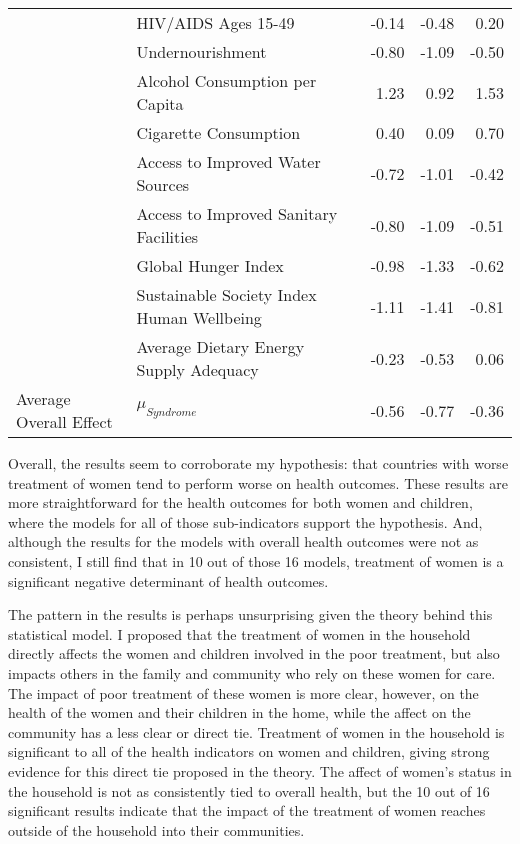 \begin{table}[htb]
\begin{tabular}{l|l|r|r|r}
     & HIV/AIDS Ages 15-49  & -0.14 & -0.48 & 0.20 \\ 
     & Undernourishment  & -0.80 & -1.09 & -0.50 \\     
     & Alcohol Consumption per Capita  & 1.23 & 0.92 & 1.53 \\ 
     & Cigarette Consumption  &  0.40 & 0.09 & 0.70 \\
     & Access to Improved Water Sources  & -0.72 & -1.01 & -0.42 \\
     & Access to Improved Sanitary Facilities  & -0.80 & -1.09 & -0.51 \\ 
     & Global Hunger Index  &  -0.98 & -1.33 & -0.62 \\ 
     & Sustainable Society Index Human Wellbeing  &  -1.11 & -1.41 & -0.81 \\ 
     & Average Dietary Energy Supply Adequacy  & -0.23 & -0.53 & 0.06 \\ 
      \hline
      \hline
      Average Overall Effect & $\mu_{Syndrome}$ & -0.56 & -0.77 & -0.36 \\
    \end{tabular}
    \label{synest}
\end{table}

Overall, the results seem to corroborate my hypothesis: that countries with worse treatment of women tend to perform worse on health outcomes. These results are more straightforward for the health outcomes for both women and children, where the models for all of those sub-indicators support the hypothesis. And, although the results for the models with overall health outcomes were not as consistent, I still find that in 10 out of those 16 models, treatment of women is a significant negative determinant of health outcomes. 

The pattern in the results is perhaps unsurprising given the theory behind this statistical model. I proposed that the treatment of women in the household directly affects the women and children involved in the poor treatment, but also impacts others in the family and community who rely on these women for care. The impact of poor treatment of these women is more clear, however, on the health of the women and their children in the home, while the affect on the community has a less clear or direct tie. Treatment of women in the household is significant to all of the health indicators on women and children, giving strong evidence for this direct tie proposed in the theory. The affect of women's status in the household is not as consistently tied to overall health, but the 10 out of 16 significant results indicate that the impact of the treatment of women reaches outside of the household into their communities. 

